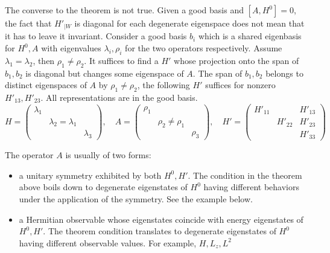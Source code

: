 \begin{remark}
    The converse to the theorem is not true. Given a good basis and $[A, H^0]=0$, the fact 
    that $H'_{|W}$ is diagonal for each degenerate eigenspace does not mean that it has to 
    leave it invariant. Consider a good basis $b_i$ which is a shared eigenbasis for $H^0, A$ 
    with eigenvalues $\lambda_i, \rho_i$ for the two operators respectively. 
    Assume $\lambda_1 = \lambda_2$, then $\rho_1\neq \rho_2$.
    It suffices to find a $H'$ whose projection onto the span of $b_1, b_2$ 
    is diagonal but changes some eigenspace of $A$. The span of $b_1, b_2$ belongs 
    to distinct eigenspaces of $A$ by $\rho_1\neq \rho_2$, the following $H'$ suffices 
    for nonzero $H'_{13}, H'_{23}$. All representations are in the good basis. 
    \[ 
        H = \begin{pmatrix}
            \lambda_1 \\ & \lambda_2=\lambda_1 \\ &&\lambda_3 
        \end{pmatrix}, \quad 
        A = \begin{pmatrix}
            \rho_1 \\ & \rho_2\neq \rho_1 \\ &&\rho_3
        \end{pmatrix}, \quad 
        H' = \begin{pmatrix}
            H'_{11} && H'_{13} \\ & H'_{22} & H'_{23} \\ &&H'_{33} 
        \end{pmatrix}
    \] 
\end{remark}
\begin{remark}
    The operator $A$ is usually of two forms: 
    \begin{itemize}
        \item a unitary symmetry exhibited by both $H^0, H'$. 
        The condition in the theorem above boils down to degenerate eigenstates of $H^0$ 
        having different behaviors under the application of the symmetry. See the example below. 
        \item a Hermitian observable whose eigenstates coincide with energy eigenstates 
        of $H^0, H'$. The theorem condition translates to degenerate eigenstates of $H^0$ 
        having different observable values. For example, $H, L_z, L^2$ 
    \end{itemize}
\end{remark}
